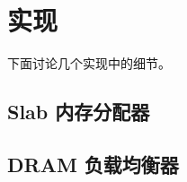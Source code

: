 \section{实现}
\label{kvdirect:sec:implementation}



%

下面讨论几个实现中的细节。



\subsection{Slab 内存分配器}



\subsection{DRAM 负载均衡器}


